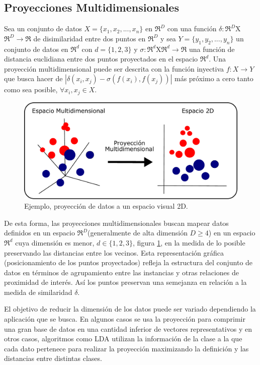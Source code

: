 		\subsection{Proyecciones Multidimensionales}
		\begin{defn}
		 Sea un conjunto de datos $X=\{x_1,x_2,...,x_n\}$ en $\Re^D$ con una función $\delta:\Re^D$X$\Re^D \to \Re$ de disimilaridad entre dos puntos en $\Re^D$ y sea $Y=\{y_1,y_2,...,y_n\}$ un conjunto de datos en $\Re^d$ con $d=\{1,2,3\}$  y $\sigma:\Re^d$X$\Re^d \to \Re$ una función de distancia euclidiana entre dos puntos proyectados en el espacio $\Re^d$. Una proyección multidimensional puede ser descrita con la función inyectiva $f:X \to Y$ que busca hacer de $|\delta(x_i,x_j)-\sigma(f(x_i),f(x_j))|$ más próximo  a cero tanto como sea posible, $ \forall x_i,x_j \in X$.\end{defn} 
\begin{figure}[!h]
\centering
\includegraphics[width=0.8\columnwidth]{figs/PM}%
\caption{Ejemplo, proyección de datos a un espacio visual 2D.}%
\label{fig:PM}%
\end{figure}
De esta forma, las proyecciones multidimensionales buscan mapear datos definidos en un espacio $\Re^D$(generalmente de alta dimensión $D\geq 4$) en un espacio $\Re^d$ cuya dimensión es menor, $d  \in \{1,2,3\}$, figura \ref{fig:PM}, en la medida de lo posible preservando las distancias entre los vecinos. Esta representación gráfica (posicionamiento de los puntos proyectados) refleja la estructura del conjunto de datos en términos de agrupamiento entre las instancias y otras relaciones de proximidad de interés. Así los puntos preservan una semejanza en relación a la medida de similaridad $\delta$.

El objetivo de reducir la dimensión de los datos puede ser variado dependiendo la aplicación que se busca. En algunos casos se usa la proyección para comprimir una gran base de datos en una cantidad inferior de vectores  representativos \cite{Kohonen2001SM} y en otros casos, algoritmos como \ac{LDA} utilizan la información de la clase a la que cada dato pertenece para realizar la proyección maximizando la definición y las distancias entre distintas clases. 

